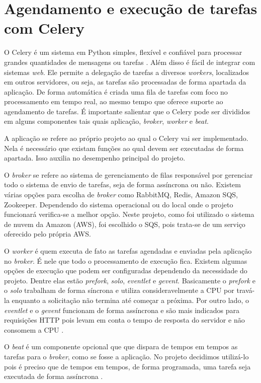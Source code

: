 \section{Agendamento e execução de tarefas com Celery}

\indent 
\par O Celery é um sistema em Python simples, flexível e confiável para processar grandes quantidades de mensagens ou tarefas \cite{Celery}. Além disso é fácil de integrar com sistemas \textit{web}. Ele permite a delegação de tarefas a diversos \textit{workers}, localizados em outros servidores, ou seja, as tarefas são processadas de forma apartada da aplicação. De forma automática é criada uma fila de tarefas com foco no processamento em tempo real, ao mesmo tempo que oferece suporte ao agendamento de tarefas. É importante salientar que o Celery pode ser divididos em alguns componentes tais quais aplicação, \textit{broker}, \textit{worker} e \textit{beat}.
\indent 
\par A aplicação se refere ao próprio projeto ao qual o Celery vai ser implementado. Nela é necessário que existam funções ao qual devem ser executadas de forma apartada. Isso auxilia no desempenho principal do projeto.
\indent 
\par O \textit{broker} se refere ao sistema de gerenciamento de filas responsável por gerenciar todo o sistema de envio de tarefas, seja de forma assíncrona ou não. Existem várias opções para escolha de \textit{broker} como RabbitMQ, Redis, Amazon SQS, Zookeeper. Dependendo do sistema operacional ou do local onde o projeto funcionará verifica-se a melhor opção. Neste projeto, como foi utilizado o sistema de nuvem da Amazon (AWS), foi escolhido o SQS, pois trata-se de um serviço oferecido pelo própria AWS.
\indent 
\par O \textit{worker} é quem executa de fato as tarefas agendadas e enviadas pela aplicação no \textit{broker}. É nele que todo o processamento de execução fica. Existem algumas opções de execução que podem ser configuradas dependendo da necessidade do projeto. Dentre elas estão \textit{prefork}, \textit{solo}, \textit{eventlet} e \textit{gevent}. Basicamente o \textit{prefork} e o \textit{solo} trabalham de forma síncrona e utiliza consideravelmente a CPU por travá-la enquanto a solicitação não termina até começar a próxima. Por outro lado, o \textit{eventlet} e o \textit{gevent} funcionam de forma assíncrona e são mais indicados para requisições HTTP pois levam em conta o tempo de resposta do servidor e não consomem a CPU \cite{CeleryEP}. 
\indent 
\par O \textit{beat} é um componente opcional que que dispara de tempos em tempos as tarefas para o \textit{broker}, como se fosse a aplicação. No projeto decidimos utilizá-lo pois é preciso que de tempos em tempos, de forma programada, uma tarefa seja executada de forma assíncrona \cite{CeleryTAP}.

